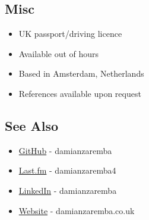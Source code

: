 \subsection{Misc}\label{misc}

\begin{itemize}
\tightlist
\item
  UK passport/driving licence
\item
  Available out of hours
\item
  Based in Amsterdam, Netherlands
\item
  References available upon request
\end{itemize}

\subsection{See Also}\label{see-also}

\begin{itemize}
\tightlist
\item
  \href{https://github.com/damianzaremba}{GitHub} - damianzaremba
\item
  \href{http://last.fm/user/damianzaremba4}{Last.fm} - damianzaremba4
\item
  \href{http://uk.linkedin.com/in/damianzaremba}{LinkedIn} -
  damianzaremba
\item
  \href{http://damianzaremba.co.uk}{Website} - damianzaremba.co.uk
\end{itemize}
